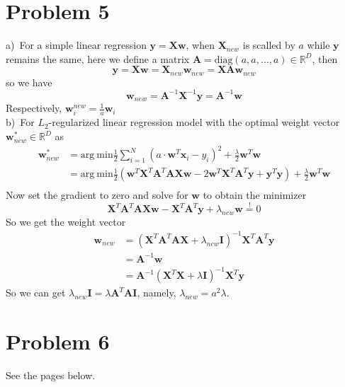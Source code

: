 \documentclass{article}
\newcommand\defeq{\stackrel{\text{!}}{=}}
\begin{document}
\section*{Problem 5}
a)\ For a simple linear regression $\bm{y}=\bm{Xw}$, when $\bm{X}_{new}$ is scalled by $a$ while $\bm{y}$ remains the same, here we define a matrix $\bm{A} = \mathrm{diag}(a,a,\dots,a) \in \mathbb{R}^D$, then
\begin{equation}
\bm{y} = \bm{Xw} = \bm{X}_{new} \bm{w}_{new} = \bm{XA}\bm{w}_{new}
\end{equation}
so we have
\begin{equation}
\bm{w}_{new} = \bm{A}^{-1}\bm{X}^{-1}\bm{y} = \bm{A}^{-1}\bm{w}
\end{equation}
Respectively, $\bm{w}_i^{new} = \frac{1}{a} \bm{w}_i$\\
b)\ For $L_2$-regularized linear regression model with the optimal weight vector $\bm{w}_{new}^* \in \mathbb{R}^D$ as
\begin{equation}
\begin{aligned}
\bm{w}_{new}^* 
&= \mathrm{arg\ min} \frac{1}{2}\sum_{i=1}^{N}(a\cdot \bm{w}^T\bm{x}_i-y_i)^2 + \frac{\lambda}{2}\bm{w}^T\bm{w}\\
&= \mathrm{arg\ min} \frac{1}{2}(\bm{w}^T\bm{X}^T\bm{A}^T\bm{AX w} - 2\bm{w}^T\bm{X}^T\bm{A}^T\bm{y} +\bm{y}^T\bm{y}) + \frac{\lambda}{2}\bm{w}^T\bm{w}\\
\end{aligned}
\end{equation}
Now set the gradient to zero and solve for $\bm{w}$ to obtain the minimizer
\begin{equation}
\bm{X}^T\bm{A}^T\bm{A}\bm{Xw} -\bm{X}^T\bm{A}^T\bm{y} + \lambda_{new}\bm{w}  \defeq 0
\end{equation}
So we get the weight vector
\begin{equation}
\begin{aligned}
\bm{w}_{new} 
&= (\bm{X}^T\bm{A}^T\bm{A}\bm{X} + \lambda_{new}\bm{I})^{-1}\bm{X}^T\bm{A}^T\bm{y}\\
&= \bm{A}^{-1}\bm{w}\\
&= \bm{A}^{-1}(\bm{X}^T\bm{X}+\lambda\bm{I})^{-1}\bm{X}^T\bm{y}
\end{aligned}
\end{equation}
So we can get $\lambda_{new}\bm{I} = \lambda\bm{A}^T\bm{A}\bm{I}$, namely, $\lambda_{new} = a^2\lambda$.
\section*{Problem 6}
See the pages below.
\end{document}
